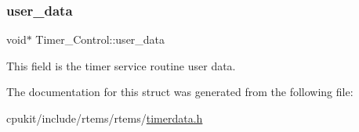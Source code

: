 \subsubsection{\texorpdfstring{user\_data}{user\_data}}
{\footnotesize\ttfamily void$\ast$ Timer\+\_\+\+Control\+::user\+\_\+data}

This field is the timer service routine user data. 

The documentation for this struct was generated from the following file\+:\begin{DoxyCompactItemize}
\item 
cpukit/include/rtems/rtems/\mbox{\hyperlink{timerdata_8h}{timerdata.\+h}}\end{DoxyCompactItemize}
